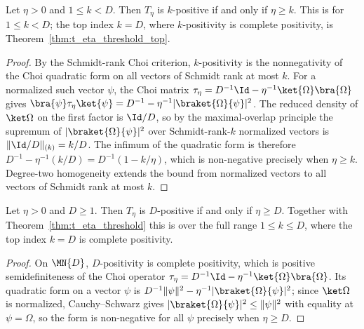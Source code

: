 \begin{theorem}
    \label{thm:t_eta_threshold}
    \leanok
    Let $\eta>0$ and $1\le k<D$. Then $T_\eta$ is $k$-positive if and only if
    $\eta\ge k$. This is \cite[Equation~(3.11)]{Wolf2012Quantum} for $1\le k<D$;
    the top index $k=D$, where $k$-positivity is complete positivity, is
    Theorem~\ref{thm:t_eta_threshold_top}.
\end{theorem}

\begin{proof}
    \leanok
    By the Schmidt-rank Choi criterion, $k$-positivity is the nonnegativity of
    the Choi quadratic form on all vectors of Schmidt rank at most $k$. For a
    normalized such vector $\psi$, the Choi matrix
    $\tau_\eta=D^{-1}\Id-\eta^{-1}\ket{\Omega}\bra{\Omega}$ gives
    $\bra{\psi}\tau_\eta\ket{\psi}
        =D^{-1}-\eta^{-1}|\braket{\Omega}{\psi}|^2$.
    The reduced density of $\ket\Omega$ on the first factor is $\Id/D$, so by the
    maximal-overlap principle the supremum of $|\braket{\Omega}{\psi}|^2$ over
    Schmidt-rank-$k$ normalized vectors is $\|\Id/D\|_{(k)}=k/D$. The infimum of
    the quadratic form is therefore $D^{-1}-\eta^{-1}(k/D)=D^{-1}(1-k/\eta)$,
    which is non-negative precisely when $\eta\ge k$. Degree-two homogeneity
    extends the bound from normalized vectors to all vectors of Schmidt rank at
    most $k$.
\end{proof}

\begin{theorem}
    \label{thm:t_eta_threshold_top}
    \leanok
    Let $\eta>0$ and $D\ge 1$. Then $T_\eta$ is $D$-positive if and only if
    $\eta\ge D$.
    Together with Theorem~\ref{thm:t_eta_threshold} this is
    \cite[Equation~(3.11)]{Wolf2012Quantum} over the full range $1\le k\le D$,
    where the top index $k=D$ is complete positivity.
\end{theorem}

\begin{proof}
    \leanok
    On $\MN{D}$, $D$-positivity is complete positivity, which is
    positive semidefiniteness of the Choi operator
    $\tau_\eta=D^{-1}\Id-\eta^{-1}\ket{\Omega}\bra{\Omega}$. Its quadratic form on
    a vector $\psi$ is $D^{-1}\|\psi\|^2-\eta^{-1}|\braket{\Omega}{\psi}|^2$; since
    $\ket\Omega$ is normalized, Cauchy--Schwarz gives
    $|\braket{\Omega}{\psi}|^2\le\|\psi\|^2$ with equality at $\psi=\Omega$, so the
    form is non-negative for all $\psi$ precisely when $\eta\ge D$.
\end{proof}

